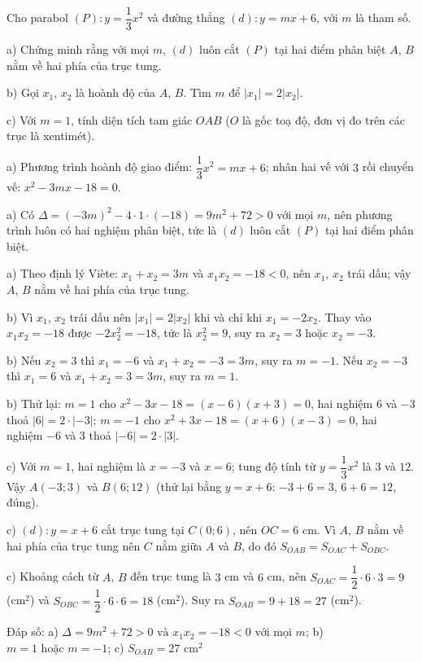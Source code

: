 \begin{problem}[9DS-HSB2-047]
Cho parabol $(P)\colon y = \dfrac{1}{3}x^2$ và đường thẳng $(d)\colon y = mx + 6$, với $m$ là tham số.

a) Chứng minh rằng với mọi $m$, $(d)$ luôn cắt $(P)$ tại hai điểm phân biệt $A$, $B$ nằm về hai phía của trục tung.

b) Gọi $x_1$, $x_2$ là hoành độ của $A$, $B$. Tìm $m$ để $|x_1| = 2|x_2|$.

c) Với $m = 1$, tính diện tích tam giác $OAB$ ($O$ là gốc toạ độ, đơn vị đo trên các trục là xentimét).

\begin{solution}
a) Phương trình hoành độ giao điểm: $\dfrac{1}{3}x^2 = mx + 6$; nhân hai vế với $3$ rồi chuyển vế: $x^2 - 3mx - 18 = 0$.

a) Có $\Delta = (-3m)^2 - 4 \cdot 1 \cdot (-18) = 9m^2 + 72 > 0$ với mọi $m$, nên phương trình luôn có hai nghiệm phân biệt, tức là $(d)$ luôn cắt $(P)$ tại hai điểm phân biệt.

a) Theo định lý Viète: $x_1 + x_2 = 3m$ và $x_1x_2 = -18 < 0$, nên $x_1$, $x_2$ trái dấu; vậy $A$, $B$ nằm về hai phía của trục tung.

b) Vì $x_1$, $x_2$ trái dấu nên $|x_1| = 2|x_2|$ khi và chỉ khi $x_1 = -2x_2$. Thay vào $x_1x_2 = -18$ được $-2x_2^2 = -18$, tức là $x_2^2 = 9$, suy ra $x_2 = 3$ hoặc $x_2 = -3$.

b) Nếu $x_2 = 3$ thì $x_1 = -6$ và $x_1 + x_2 = -3 = 3m$, suy ra $m = -1$. Nếu $x_2 = -3$ thì $x_1 = 6$ và $x_1 + x_2 = 3 = 3m$, suy ra $m = 1$.

b) Thử lại: $m = 1$ cho $x^2 - 3x - 18 = (x - 6)(x + 3) = 0$, hai nghiệm $6$ và $-3$ thoả $|6| = 2 \cdot |-3|$; $m = -1$ cho $x^2 + 3x - 18 = (x + 6)(x - 3) = 0$, hai nghiệm $-6$ và $3$ thoả $|-6| = 2 \cdot |3|$.

c) Với $m = 1$, hai nghiệm là $x = -3$ và $x = 6$; tung độ tính từ $y = \dfrac{1}{3}x^2$ là $3$ và $12$. Vậy $A(-3; 3)$ và $B(6; 12)$ (thử lại bằng $y = x + 6$: $-3 + 6 = 3$, $6 + 6 = 12$, đúng).

c) $(d)\colon y = x + 6$ cắt trục tung tại $C(0; 6)$, nên $OC = 6$ cm. Vì $A$, $B$ nằm về hai phía của trục tung nên $C$ nằm giữa $A$ và $B$, do đó $S_{OAB} = S_{OAC} + S_{OBC}$.

c) Khoảng cách từ $A$, $B$ đến trục tung là $3$ cm và $6$ cm, nên $S_{OAC} = \dfrac{1}{2} \cdot 6 \cdot 3 = 9$ (cm$^2$) và $S_{OBC} = \dfrac{1}{2} \cdot 6 \cdot 6 = 18$ (cm$^2$). Suy ra $S_{OAB} = 9 + 18 = 27$ (cm$^2$).

Đáp số: a) $\boxed{\Delta = 9m^2 + 72 > 0 \text{ và } x_1x_2 = -18 < 0 \text{ với mọi } m}$; b) $\boxed{m = 1 \text{ hoặc } m = -1}$; c) $\boxed{S_{OAB} = 27 \text{ cm}^2}$
\end{solution}
\end{problem}

